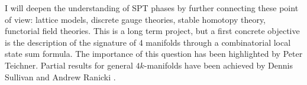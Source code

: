 I will deepen the understanding of SPT phases by further connecting these point of view: lattice models, discrete gauge theories, stable homotopy theory, functorial field theories.
This is a long term project, but a first concrete objective is the description of the signature of 4 manifolds through a combinatorial local state sum formula.
The importance of this question has been highlighted by Peter Teichner.
Partial results for general $4k$-manifolds have been achieved by Dennis Sullivan and Andrew Ranicki \cite{sullivan1976signature}.



%

